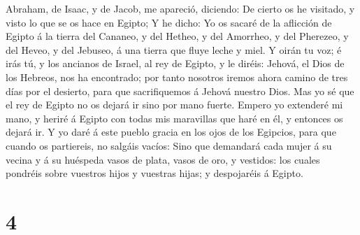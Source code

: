 Abraham, de Isaac, y de Jacob, me apareció, diciendo: De cierto os he
visitado, y visto lo que se os hace en Egipto;  Y he
dicho: Yo os sacaré de la aflicción de Egipto á la tierra del Cananeo, y
del Hetheo, y del Amorrheo, y del Pherezeo, y del Heveo, y del Jebuseo,
á una tierra que fluye leche y miel.  Y oirán tu voz; é
irás tú, y los ancianos de Israel, al rey de Egipto, y le diréis:
Jehová, el Dios de los Hebreos, nos ha encontrado; por tanto nosotros
iremos ahora camino de tres días por el desierto, para que sacrifiquemos
á Jehová nuestro Dios.  Mas yo sé que el rey de Egipto no
os dejará ir sino por mano fuerte.  Empero yo extenderé
mi mano, y heriré á Egipto con todas mis maravillas que haré en él, y
entonces os dejará ir.  Y yo daré á este pueblo gracia en
los ojos de los Egipcios, para que cuando os partiereis, no salgáis
vacíos:  Sino que demandará cada mujer á su vecina y á su
huéspeda vasos de plata, vasos de oro, y vestidos: los cuales pondréis
sobre vuestros hijos y vuestras hijas; y despojaréis á Egipto.

\hypertarget{section-3}{%
\section{4}\label{section-3}}

